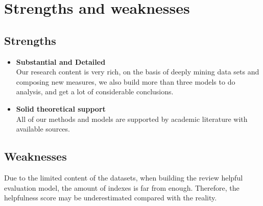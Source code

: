 \documentclass{mcmthesis}
\begin{document}
\section{Strengths and weaknesses}

\subsection{Strengths}
\begin{itemize}
\item \textbf{Substantial and Detailed}\\
Our research content is very rich, on the basis of deeply mining data sets and composing new measures, we also build more than three models to do analysis, and get a lot of considerable conclusions.
\item \textbf{Solid theoretical support}\\
All of our methods and models are supported by academic literature with available sources.
\end{itemize}

\subsection{Weaknesses}
\quad \quad Due to the limited content of the datasets, when building the review helpful evaluation model, the amount of indexes is far from enough. Therefore, the helpfulness score may be underestimated compared with the reality.
\end{document}
